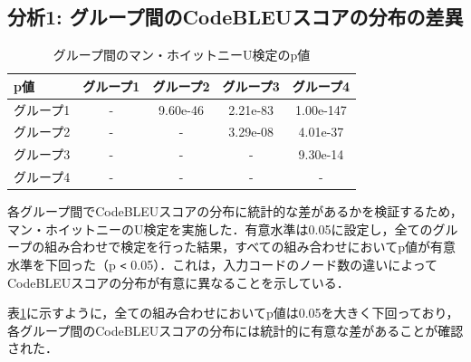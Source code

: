 \documentclass[11pt]{jreport}
\begin{document}
\subsection {分析1: グループ間のCodeBLEUスコアの分布の差異}

\begin{table}[h]
   \centering
   \caption{グループ間のマン・ホイットニーU検定のp値}
   \label{tab:mann-whitney}
   \begin{tabular}{l|cccc}
       \hline
       p値 & グループ1 & グループ2 & グループ3 & グループ4 \\
       \hline
       グループ1 & - & 9.60e-46 & 2.21e-83 & 1.00e-147 \\
       グループ2 & - & - & 3.29e-08 & 4.01e-37 \\
       グループ3 & - & - & - & 9.30e-14 \\
       グループ4 & - & - & - & - \\
       \hline
   \end{tabular}
\end{table}

各グループ間でCodeBLEUスコアの分布に統計的な差があるかを検証するため，マン・ホイットニーのU検定を実施した．有意水準は0.05に設定し，全てのグループの組み合わせで検定を行った結果，すべての組み合わせにおいてp値が有意水準を下回った（p \verb|<| 0.05）．これは，入力コードのノード数の違いによってCodeBLEUスコアの分布が有意に異なることを示している．

表\ref{tab:mann-whitney}に示すように，全ての組み合わせにおいてp値は0.05を大きく下回っており，各グループ間のCodeBLEUスコアの分布には統計的に有意な差があることが確認された．
\end{document}
